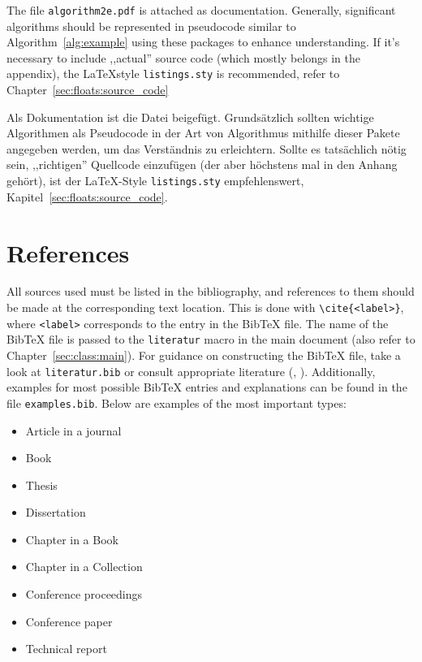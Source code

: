 The file \verb|algorithm2e.pdf| is attached as documentation. Generally, significant algorithms should be represented in pseudocode similar to Algorithm~\ref{alg:example} using these packages to enhance understanding. If it's necessary to include ,,actual'' source code (which mostly belongs in the appendix), the \LaTeX style \verb|listings.sty| is recommended, refer to Chapter~\ref{sec:floats:source_code}

Als Dokumentation ist die Datei  beigef\"ugt. Grunds\"atzlich
sollten wichtige Algorithmen als Pseudocode in der Art von
Algorithmus mithilfe dieser Pakete angegeben
werden, um das Verst\"andnis zu erleichtern. Sollte es tats\"achlich n\"otig
sein, ,,richtigen'' Quellcode einzuf\"ugen (der aber h\"ochstens mal in
den Anhang geh\"ort), ist der \LaTeX -Style \verb|listings.sty|
empfehlenswert, Kapitel~\ref{sec:floats:source_code}.


\section{References}
\label{sec:floats:bib}
 All sources used must be listed in the bibliography, and references to them should be made at the corresponding text location. This is done with \verb|\cite{<label>}|, where \verb|<label>| corresponds to the entry in the BibTeX file. The name of the BibTeX file is passed to the \verb|literatur| macro in the main document (also refer to Chapter~\ref{sec:class:main}). For guidance on constructing the BibTeX file, take a look at \verb|literatur.bib| or consult appropriate literature (\cite{Lamport95}, \cite{WWWBibTex}). Additionally, examples for most possible BibTeX entries and explanations can be found in the file \verb|examples.bib|. Below are examples of the most important types:

\begin{itemize}
 \item Article in a journal~\cite{Albiez03}
 \item Book~\cite{Arkin98}
 \item Thesis~\cite{Luksch02}
 \item Dissertation~\cite{Breazeal00}
 \item Chapter in a Book~\cite{Mendel70}
 \item Chapter in a Collection~\cite{Ilg99}
 \item Conference proceedings~\cite{Berns07}
 \item Conference paper~\cite{Berns06}
 \item Technical report~\cite{Schaefer03}
\end{itemize}

